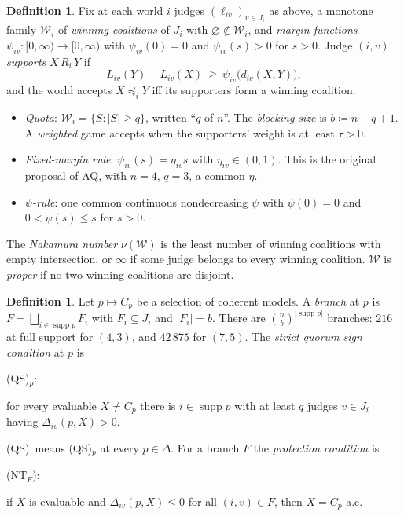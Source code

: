 \documentclass[11pt]{article}
\theoremstyle{definition}
\newtheorem{definition}[theorem]{Definition}
\theoremstyle{remark}
\newcommand{\W}{\mathcal W}
\newcommand{\supp}{\operatorname{supp}}
\newcommand{\src}[1]{\textsf{#1}}
\newcommand{\QS}{\textup{(QS)}}
\newcommand{\NT}{\textup{(NT$_F$)}}
\begin{document}
\begin{definition}\label{def:quorum}
Fix at each world $i$ judges $(\ell_{iv})_{v\in J_i}$ as above, a monotone family $\W_i$ of \emph{winning coalitions} of $J_i$ with $\varnothing\notin\W_i$, and \emph{margin functions} $\psi_{iv}:[0,\infty)\to[0,\infty)$ with $\psi_{iv}(0)=0$ and $\psi_{iv}(s)>0$ for $s>0$. Judge $(i,v)$ \emph{supports} $X\,R_i\,Y$ if
\[
L_{iv}(Y)-L_{iv}(X)\ \ge\ \psi_{iv}\bigl(d_{iv}(X,Y)\bigr),
\]
and the world accepts $X\preceq_iY$ iff its supporters form a winning coalition.
\begin{itemize}[leftmargin=*]
\item \emph{Quota}: $\W_i=\{S:|S|\ge q\}$, written ``$q$-of-$n$''. The \emph{blocking size} is $b\coloneqq n-q+1$. A \emph{weighted} game accepts when the supporters' weight is at least $\tau>0$.
\item \emph{Fixed-margin rule}: $\psi_{iv}(s)=\eta_{iv}s$ with $\eta_{iv}\in(0,1)$. This is the original proposal of \src{AQ}, with $n=4$, $q=3$, a common $\eta$.
\item \emph{$\psi$-rule}: one common continuous nondecreasing $\psi$ with $\psi(0)=0$ and $0<\psi(s)\le s$ for $s>0$.
\end{itemize}
The \emph{Nakamura number} $\nu(\W)$ is the least number of winning coalitions with empty intersection, or $\infty$ if some judge belongs to every winning coalition. $\W$ is \emph{proper} if no two winning coalitions are disjoint.
\end{definition}

\begin{definition}\label{def:QS}
Let $p\mapsto C_p$ be a selection of coherent models. A \emph{branch} at $p$ is $F=\bigsqcup_{i\in\supp p}F_i$ with $F_i\subseteq J_i$ and $|F_i|=b$. There are $\binom nb^{|\supp p|}$ branches: $216$ at full support for $(4,3)$, and $42\,875$ for $(7,5)$. The \emph{strict quorum sign condition} at $p$ is
\begin{center}
\QS$_p$:\quad \parbox[t]{0.8\textwidth}{for every evaluable $X\ne C_p$ there is $i\in\supp p$ with at least $q$ judges $v\in J_i$ having $\Delta_{iv}(p,X)>0$.}
\end{center}
\QS\ means \QS$_p$ at every $p\in\Delta$. For a branch $F$ the \emph{protection condition} is
\begin{center}
\NT:\quad \parbox[t]{0.8\textwidth}{if $X$ is evaluable and $\Delta_{iv}(p,X)\le0$ for all $(i,v)\in F$, then $X=C_p$ a.e.}
\end{center}
\end{definition}
\end{document}
